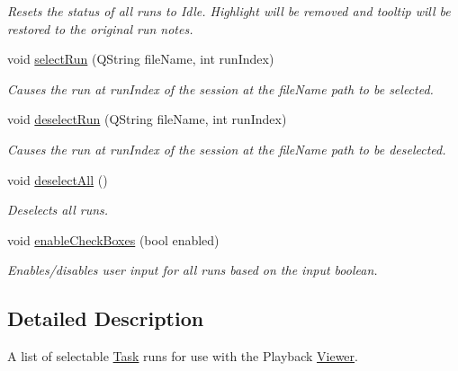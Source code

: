 \begin{DoxyCompactItemize}
\begin{DoxyCompactList}\small\item\em Resets the status of all runs to Idle. Highlight will be removed and tooltip will be restored to the original run notes. \end{DoxyCompactList}\item 
void \hyperlink{class_picto_1_1_run_selector_widget_ab8427a8e297e63cc72d4a70577a1e070}{select\-Run} (Q\-String file\-Name, int run\-Index)
\begin{DoxyCompactList}\small\item\em Causes the run at run\-Index of the session at the file\-Name path to be selected. \end{DoxyCompactList}\item 
void \hyperlink{class_picto_1_1_run_selector_widget_a9b8666af84027eef6c9539be57c0cfc2}{deselect\-Run} (Q\-String file\-Name, int run\-Index)
\begin{DoxyCompactList}\small\item\em Causes the run at run\-Index of the session at the file\-Name path to be deselected. \end{DoxyCompactList}\item 
\hypertarget{class_picto_1_1_run_selector_widget_aab474451000e3c8cd41800fd18693839}{void \hyperlink{class_picto_1_1_run_selector_widget_aab474451000e3c8cd41800fd18693839}{deselect\-All} ()}\label{class_picto_1_1_run_selector_widget_aab474451000e3c8cd41800fd18693839}

\begin{DoxyCompactList}\small\item\em Deselects all runs. \end{DoxyCompactList}\item 
\hypertarget{class_picto_1_1_run_selector_widget_a50c5be487bb6716e7446bb684818382f}{void \hyperlink{class_picto_1_1_run_selector_widget_a50c5be487bb6716e7446bb684818382f}{enable\-Check\-Boxes} (bool enabled)}\label{class_picto_1_1_run_selector_widget_a50c5be487bb6716e7446bb684818382f}

\begin{DoxyCompactList}\small\item\em Enables/disables user input for all runs based on the input boolean. \end{DoxyCompactList}\end{DoxyCompactItemize}


\subsection{Detailed Description}
A list of selectable \hyperlink{class_picto_1_1_task}{Task} runs for use with the Playback \hyperlink{class_viewer}{Viewer}. 

